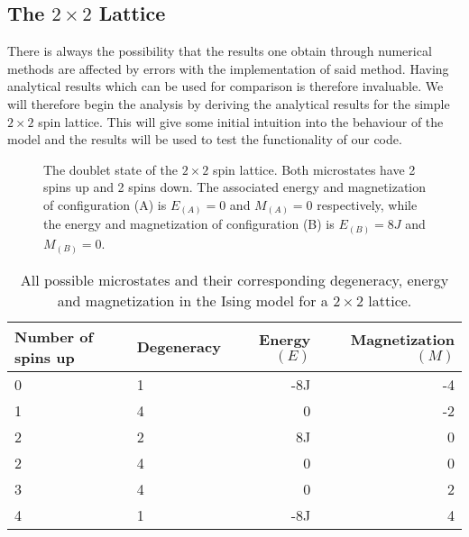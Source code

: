 \documentclass[a4paper, 10pt, reqno]{amsart}
\begin{document}
\subsection{The $2\times 2$ Lattice} There is always the
possibility that the results one obtain through numerical methods are
affected by errors with the implementation of said method. Having analytical
results which can be used for comparison is therefore invaluable. We will
therefore begin the analysis by deriving the analytical results for the
simple $2 \times 2$ spin lattice. This will give some initial intuition into
the behaviour of the model and the results will be used to test the
functionality of our code.

\begin{figure}[h]
	\centering
	 \hspace{10mm}
	\caption{ The doublet state of the $2\times2$ spin lattice. Both
	microstates have 2 spins up and 2 spins down. The associated energy and
	magnetization of configuration (A) is $E_{(A)} = 0$ and $M_{(A)} = 0$
	respectively, while the energy and magnetization of configuration (B) is
	$E_{(B)} = 8J$ and $M_{(B)} = 0$.}
	\label{fig: 2x2}
\end{figure}

\begin{table}
\caption{All possible microstates and their corresponding degeneracy, energy and magnetization in the Ising model for a $2 \times 2$ lattice.  }
\label{tab: 2x2}
\begin{tabular}{llrr}
\hline
Number of spins up & Degeneracy & Energy $(E)$ & Magnetization $(M)$ \\ \hline
0 & 1 & -8J & -4 \\
1 & 4 & 0 & -2 \\
2 & 2 & 8J & 0 \\
2 & 4 & 0 & 0 \\
3 & 4 & 0 & 2 \\
4 & 1 & -8J & 4 \\ \hline
\end{tabular}
\end{table}
\end{document}
